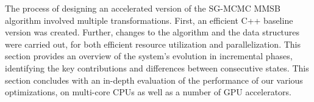 
The process of designing an accelerated version of the SG-MCMC MMSB algorithm
involved multiple transformations. First, an efficient C++ baseline version
was created. Further, changes to the algorithm and the data structures
were carried out, for both efficient resource utilization and parallelization.
This section provides an overview of the system's evolution in incremental
phases, identifying the key contributions and differences between consecutive
states. This section concludes with an in-depth evaluation of the performance
of our various optimizations, on multi-core CPUs as well as a number of GPU
accelerators.




